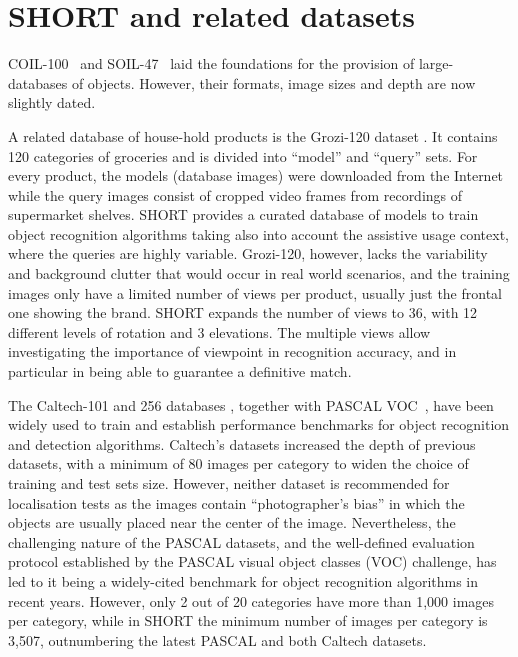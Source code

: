 \section{SHORT and related datasets} \label{sec:related-work}

COIL-100~\cite{Nene1996a} and SOIL-47~\cite{Koubaroulis2002} laid the foundations for the provision of large-databases of objects. However, their formats, image sizes and depth are now slightly dated.

A related database of house-hold products is the Grozi-120 dataset \cite{Merler2007}. It contains 120 categories of groceries and is divided into ``model'' and ``query'' sets. For every product, the models (database images) were downloaded from the Internet while the query images consist of cropped video frames from recordings of supermarket shelves. SHORT provides a curated database of models to train object recognition algorithms taking also into account the assistive usage context, where the queries are highly variable. Grozi-120, however, lacks the variability and background clutter that would occur in real world scenarios, and the training images only have a limited number of views per product, usually just the frontal one showing the brand. SHORT expands the number of views to 36, with 12 different levels of rotation and 3 elevations.  The multiple views allow investigating the importance of viewpoint in recognition accuracy, and in particular in being able to guarantee a definitive match. 

The Caltech-101 and 256 databases \cite{Feifei2007,Griffin2007}, together with PASCAL VOC~\cite{Everingham2009}, have been widely used to train and establish performance benchmarks for object recognition and detection algorithms. Caltech's datasets increased the depth of previous datasets, with a minimum of 80 images per category to widen the choice of training and test sets size. However, neither dataset is recommended for localisation tests as the images contain ``photographer's bias'' in which the objects are usually placed near the center of the image. Nevertheless, the challenging nature of the PASCAL datasets, and the well-defined evaluation protocol established by the PASCAL visual object classes (VOC) challenge, has led to it being a widely-cited benchmark for object recognition algorithms in recent years. However, only 2 out of 20 categories have more than 1,000 images per category, while in SHORT the minimum number of images per category is 3,507, outnumbering the latest PASCAL and both Caltech datasets.
 
